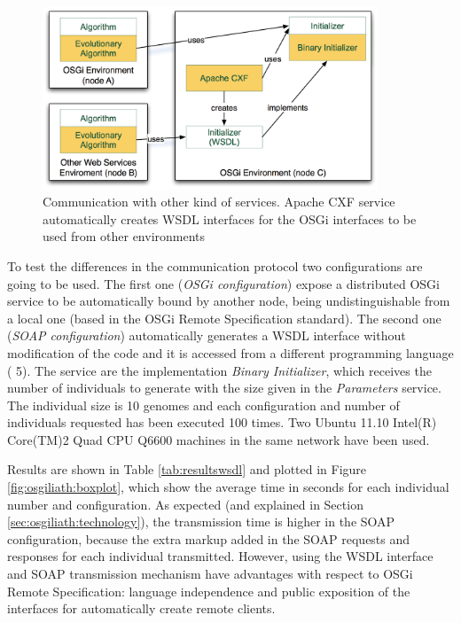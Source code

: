 \begin{figure}
\centering
\includegraphics[width=10cm]{gfx/osgiliath/axis.png}


\caption{Communication with other kind of services. Apache CXF service automatically creates WSDL interfaces for the OSGi interfaces to be used from other environments}
\label{AXISFIGURE}
\end{figure}                                

To test the differences in the communication protocol two configurations are going to be used. The first one ({\em OSGi configuration}) expose a distributed OSGi service to be automatically bound by another node, being undistinguishable from a local one (based in the OSGi Remote Specification standard). The second one ({\em SOAP configuration}) automatically generates a WSDL interface without modification of the code and it is accessed from a different programming language ( 5). The service are the implementation {\em Binary Initializer}, which receives the number of individuals to generate with the size given in the {\em Parameters} service. The individual size is 10 genomes and each configuration and number of individuals requested has been executed 100 times. Two Ubuntu 11.10 Intel(R) Core(TM)2 Quad CPU Q6600 machines in the same network have been used.

Results are shown in Table \ref{tab:resultswsdl} and plotted in Figure \ref{fig:osgiliath:boxplot}, which show the average time in seconds for each individual number and configuration. As expected (and explained in Section \ref{sec:osgiliath:technology}), the transmission time is higher in the SOAP configuration, because the extra markup added in the SOAP requests and responses for each individual transmitted. However, using the WSDL interface and SOAP transmission mechanism have advantages with respect to OSGi Remote Specification: language independence and public exposition of the interfaces for automatically create remote clients.

